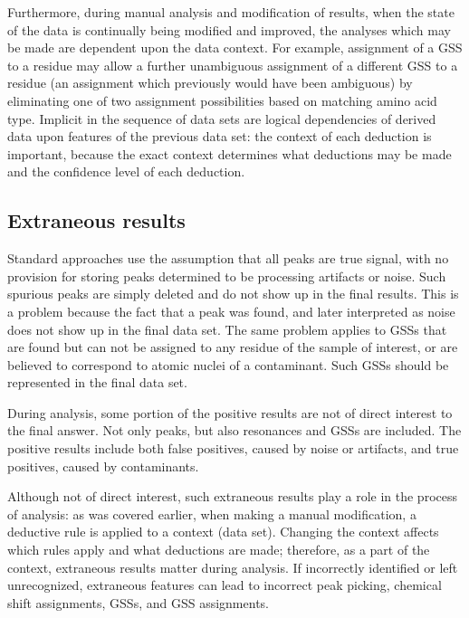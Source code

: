 
Furthermore, during manual analysis and modification of results, when the 
state of the data is continually being modified and improved, the analyses
which may be made are dependent upon the data context.
For example, assignment of a GSS to a residue may allow a further 
unambiguous assignment of a different GSS to a residue (an assignment 
which previously would have been ambiguous) by eliminating one of two 
assignment possibilities based on matching amino acid type.
Implicit in the sequence of data sets are logical dependencies of derived
data upon features of the previous data set: the context of each deduction
is important, because the exact context determines what deductions may be
made and the confidence level of each deduction. 



\subsection*{Extraneous results}
Standard approaches use the 
assumption that all peaks are true signal, with no provision for storing peaks 
determined to be processing artifacts or noise.  Such spurious peaks are simply 
deleted and do not show up in the final results.  This is a problem because the 
fact that a peak was found, and later interpreted as noise does not show up in 
the final data set.  The same problem applies to GSSs that are found 
but can not be assigned to any residue of the sample of interest, or are 
believed to correspond to atomic nuclei of a contaminant.  Such GSSs should 
be represented in the final data set.

During analysis, some portion of the positive results are not of direct interest
to the final answer.  Not only peaks, but also resonances and GSSs are included.
The positive results include both false positives, caused by noise or
artifacts, and true positives, caused by contaminants.

Although not of direct interest, such extraneous results play a role in 
the process of analysis: as was covered earlier, when making a manual
modification, a deductive rule is applied to a context (data set).  Changing 
the context affects which rules apply and what deductions are made; 
therefore, as a part of the context, extraneous results matter during analysis. 
If incorrectly identified or left unrecognized, extraneous features can
lead to incorrect peak picking, chemical shift assignments, GSSs, and GSS
assignments.

